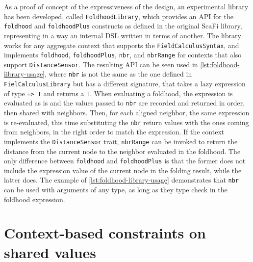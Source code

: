 As a proof of concept of the expressiveness of the \this design, an experimental library has been developed, called \texttt{FoldhoodLibrary}, which provides an \ac{API} for the \texttt{foldhood} and \texttt{foldhoodPlus} constructs as defined in the original ScaFi library, representing in a way an internal \ac{DSL} written in terms of another.
%
The library works for any aggregate context that supports the \texttt{FieldCalculusSyntax}, and implements \texttt{foldhood}, \texttt{foldhoodPlus}, \texttt{nbr}, and \texttt{nbrRange} for contexts that also support \texttt{DistanceSensor}.
%
The resulting \ac{API} can be seen used in \cref{lst:foldhood-library-usage},
where \texttt{nbr} is not the same as the one defined in \texttt{FielCalculusLibrary} but has a different signature, that takes a lazy expression of type \texttt{=> T} and returns a \texttt{T}.
%
When evaluating a foldhood, the expression is evaluated as is and the values passed to \texttt{nbr} are recorded and returned in order, then shared with neighbors.
%
Then, for each aligned neighbor, the same expression is re-evaluated, this time substituting the \texttt{nbr} return values with the ones coming from neighbors, in the right order to match the expression.
%
If the context implements the \texttt{DistanceSensor} trait, \texttt{nbrRange} can be invoked to return the distance from the current node to the neighbor evaluated in the foldhood.
%
The only difference between \texttt{foldhood} and \texttt{foldhoodPlus} is that the former does not include the expression value of the current node in the folding result, while the latter does.
%
The example of \cref{lst:foldhood-library-usage} demonstrates that \texttt{nbr} can be used with arguments of any type, as long as they type check in the foldhood expression.




\section{Context-based constraints on shared values}


